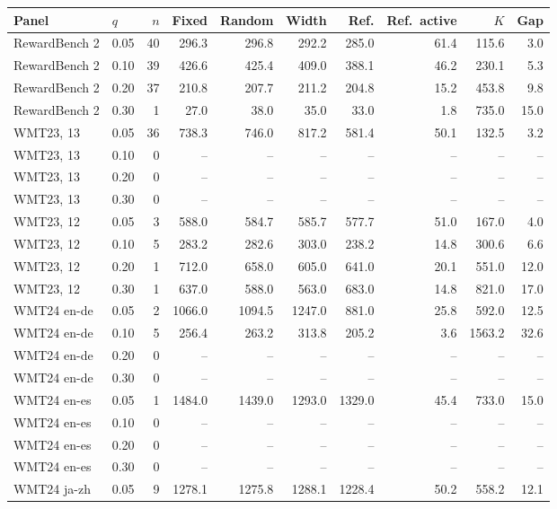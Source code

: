\begin{table}[t]
\centering\small


\begin{tabular}{llrrrrrrrr}
\toprule
Panel & $q$ & $n$ & Fixed & Random & Width & Ref. & Ref.\ active & $K$ & Gap \\
\midrule
RewardBench 2 & 0.05 & 40 & 296.3 & 296.8 & 292.2 & 285.0 & 61.4 & 115.6 & 3.0 \\
RewardBench 2 & 0.10 & 39 & 426.6 & 425.4 & 409.0 & 388.1 & 46.2 & 230.1 & 5.3 \\
RewardBench 2 & 0.20 & 37 & 210.8 & 207.7 & 211.2 & 204.8 & 15.2 & 453.8 & 9.8 \\
RewardBench 2 & 0.30 & 1 & 27.0 & 38.0 & 35.0 & 33.0 & 1.8 & 735.0 & 15.0 \\
WMT23, 13 & 0.05 & 36 & 738.3 & 746.0 & 817.2 & 581.4 & 50.1 & 132.5 & 3.2 \\
WMT23, 13 & 0.10 & 0 & -- & -- & -- & -- & -- & -- & -- \\
WMT23, 13 & 0.20 & 0 & -- & -- & -- & -- & -- & -- & -- \\
WMT23, 13 & 0.30 & 0 & -- & -- & -- & -- & -- & -- & -- \\
WMT23, 12 & 0.05 & 3 & 588.0 & 584.7 & 585.7 & 577.7 & 51.0 & 167.0 & 4.0 \\
WMT23, 12 & 0.10 & 5 & 283.2 & 282.6 & 303.0 & 238.2 & 14.8 & 300.6 & 6.6 \\
WMT23, 12 & 0.20 & 1 & 712.0 & 658.0 & 605.0 & 641.0 & 20.1 & 551.0 & 12.0 \\
WMT23, 12 & 0.30 & 1 & 637.0 & 588.0 & 563.0 & 683.0 & 14.8 & 821.0 & 17.0 \\
WMT24 en-de & 0.05 & 2 & 1066.0 & 1094.5 & 1247.0 & 881.0 & 25.8 & 592.0 & 12.5 \\
WMT24 en-de & 0.10 & 5 & 256.4 & 263.2 & 313.8 & 205.2 & 3.6 & 1563.2 & 32.6 \\
WMT24 en-de & 0.20 & 0 & -- & -- & -- & -- & -- & -- & -- \\
WMT24 en-de & 0.30 & 0 & -- & -- & -- & -- & -- & -- & -- \\
WMT24 en-es & 0.05 & 1 & 1484.0 & 1439.0 & 1293.0 & 1329.0 & 45.4 & 733.0 & 15.0 \\
WMT24 en-es & 0.10 & 0 & -- & -- & -- & -- & -- & -- & -- \\
WMT24 en-es & 0.20 & 0 & -- & -- & -- & -- & -- & -- & -- \\
WMT24 en-es & 0.30 & 0 & -- & -- & -- & -- & -- & -- & -- \\
WMT24 ja-zh & 0.05 & 9 & 1278.1 & 1275.8 & 1288.1 & 1228.4 & 50.2 & 558.2 & 12.1 \\

\end{tabular}
\end{table}
